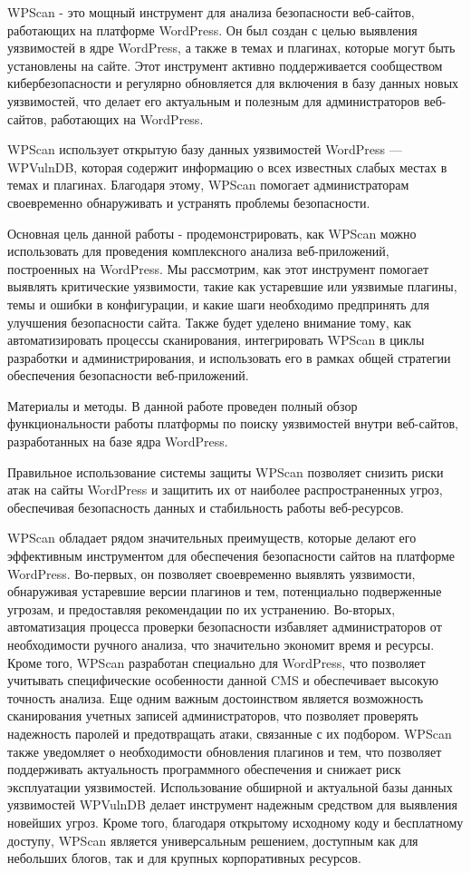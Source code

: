 \documentclass[
]{article}
\begin{document}
WPScan - это мощный инструмент для анализа безопасности веб-сайтов,
работающих на платформе WordPress. Он был создан с целью выявления
уязвимостей в ядре WordPress, а также в темах и плагинах, которые могут
быть установлены на сайте. Этот инструмент активно поддерживается
сообществом кибербезопасности и регулярно обновляется для включения в
базу данных новых уязвимостей, что делает его актуальным и полезным для
администраторов веб-сайтов, работающих на WordPress.

WPScan использует открытую базу данных уязвимостей WordPress ---
WPVulnDB, которая содержит информацию о всех известных слабых местах в
темах и плагинах. Благодаря этому, WPScan помогает администраторам
своевременно обнаруживать и устранять проблемы безопасности.

Основная цель данной работы - продемонстрировать, как WPScan можно
использовать для проведения комплексного анализа веб-приложений,
построенных на WordPress. Мы рассмотрим, как этот инструмент помогает
выявлять критические уязвимости, такие как устаревшие или уязвимые
плагины, темы и ошибки в конфигурации, и какие шаги необходимо
предпринять для улучшения безопасности сайта. Также будет уделено
внимание тому, как автоматизировать процессы сканирования, интегрировать
WPScan в циклы разработки и администрирования, и использовать его в
рамках общей стратегии обеспечения безопасности веб-приложений.

Материалы и методы. В данной работе проведен полный обзор
функциональности работы платформы по поиску уязвимостей внутри
веб-сайтов, разработанных на базе ядра WordPress.

Правильное использование системы защиты WPScan позволяет снизить риски
атак на сайты WordPress и защитить их от наиболее распространенных
угроз, обеспечивая безопасность данных и стабильность работы
веб-ресурсов.

WPScan обладает рядом значительных преимуществ, которые делают его
эффективным инструментом для обеспечения безопасности сайтов на
платформе WordPress. Во-первых, он позволяет своевременно выявлять
уязвимости, обнаруживая устаревшие версии плагинов и тем, потенциально
подверженные угрозам, и предоставляя рекомендации по их устранению.
Во-вторых, автоматизация процесса проверки безопасности избавляет
администраторов от необходимости ручного анализа, что значительно
экономит время и ресурсы. Кроме того, WPScan разработан специально для
WordPress, что позволяет учитывать специфические особенности данной CMS
и обеспечивает высокую точность анализа. Еще одним важным достоинством
является возможность сканирования учетных записей администраторов, что
позволяет проверять надежность паролей и предотвращать атаки, связанные
с их подбором. WPScan также уведомляет о необходимости обновления
плагинов и тем, что позволяет поддерживать актуальность программного
обеспечения и снижает риск эксплуатации уязвимостей. Использование
обширной и актуальной базы данных уязвимостей WPVulnDB делает инструмент
надежным средством для выявления новейших угроз. Кроме того, благодаря
открытому исходному коду и бесплатному доступу, WPScan является
универсальным решением, доступным как для небольших блогов, так и для
крупных корпоративных ресурсов.
\end{document}
